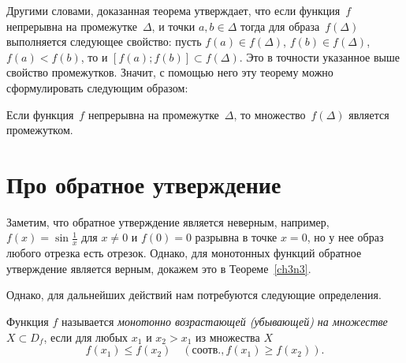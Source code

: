 Другими словами, доказанная теорема утверждает, что если функция~$f$ непрерывна на промежутке~$\Delta$, и точки $a,b\in \Delta$ тогда для образа~$f(\Delta)$ выполняется следующее свойство: пусть $f(a)\in f(\Delta)$, $f(b)\in f(\Delta)$, $f(a)<f(b)$, то и $[f(a);f(b)]\subset f(\Delta)$. Это в точности указанное выше свойство промежутков. Значит, с помощью него эту теорему можно сформулировать следующим образом:	
\begin{thmn}
Если функция~$f$ непрерывна на промежутке~$\Delta$, то множество~$f(\Delta)$ является промежутком.
\end{thmn}

\section{Про обратное утверждение}
Заметим, что обратное утверждение является неверным, например, $f(x)= \sin\frac{1}{x}$ для $x\ne0$ и $f(0) = 0$ разрывна в точке $x = 0$, но у нее образ любого отрезка есть отрезок. Однако, для монотонных функций обратное утверждение является верным, докажем это в Теореме~\ref{ch3n3}.

Однако, для дальнейших действий нам потребуются следующие определения.
\begin{defn}
Функция $f$ называется \textit{монотонно возрастающей \textup{(}убывающей) на множестве} $X \subset D_f$, если для любых $x_1$ и $x_2>x_1$ из множества $X$ 
$$
f(x_1)\le f(x_2) \quad (\text{соотв.}, f(x_1)\ge f(x_2)).
$$  
\end{defn}

